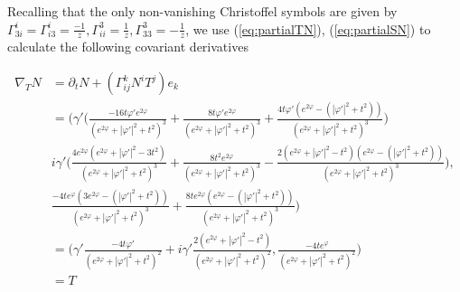 \documentclass[12pt]{amsart}
\begin{document}
Recalling that the only non-vanishing Christoffel symbols are given by $\Gamma^i_{3i} = \Gamma^i_{i3}=\frac{-1}{z}, \Gamma^3_{ii}=\frac{1}{z}, \Gamma^3_{33}=-\frac1z$, we use (\ref{eq:partialTN}), (\ref{eq:partialSN}) to calculate the following covariant derivatives

\begin{equation}\label{eq:TCovariantN}
\begin{split}
    \nabla_T N & = \partial_t N + (\Gamma^k_{ij}N^iT^j)e_k
    \\&=\bigg(\gamma'\bigg( \frac{-16t\varphi'e^{2\varphi}}{(e^{2\varphi}+|\varphi'|^2+t^2)^3} + \frac{8t\varphi'e^{2\varphi}}{(e^{2\varphi}+|\varphi'|^2+t^2)^3} + \frac{4t\varphi'(e^{2\varphi}-(|\varphi'|^2+t^2))}{(e^{2\varphi}+|\varphi'|^2+t^2)^3} \bigg) 
    \\&i\gamma'\bigg(\frac{4e^{2\varphi}(e^{2\varphi}+|\varphi'|^2-3t^2)}{(e^{2\varphi}+|\varphi'|^2+t^2)^3} + \frac{8t^2e^{2\varphi}}{(e^{2\varphi}+|\varphi'|^2+t^2)^3} - \frac{2(e^{2\varphi} + |\varphi'|^2-t^2)(e^{2\varphi}-(|\varphi'|^2+t^2))}{(e^{2\varphi}+|\varphi'|^2+t^2)^3} \bigg),
    \\&\frac{-4te^{\varphi}(3e^{2\varphi}-(|\varphi'|^2+t^2))}{(e^{2\varphi}+|\varphi'|^2+t^2)^3} + \frac{8te^{2\varphi}(e^{2\varphi}-(|\varphi'|^2+t^2))}{(e^{2\varphi}+|\varphi'|^2+t^2)^3} \bigg)
    \\&=\bigg(\gamma'\frac{-4t\varphi'}{(e^{2\varphi}+|\varphi'|^2+t^2)^2} + i\gamma' \frac{2(e^{2\varphi} + |\varphi'|^2-t^2)}{(e^{2\varphi}+|\varphi'|^2+t^2)^2}, \frac{-4te^{\varphi}}{(e^{2\varphi}+|\varphi'|^2+t^2)^2}\bigg)
    \\&=T
\end{split}
\end{equation}
\end{document}
